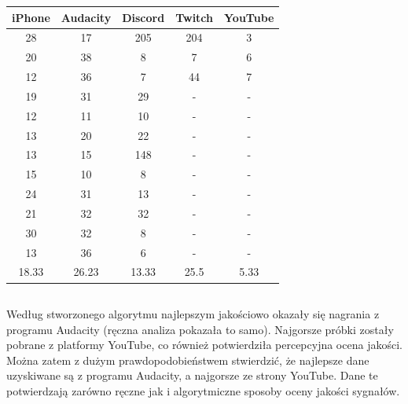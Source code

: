 \documentclass[a4paper,12pt]{extarticle}
\begin{document}
\begin{center}
    \begin{tabular}{||c c c c c||} 
     \hline
     iPhone & Audacity & Discord & Twitch & YouTube \\ [0.5ex] 
     \hline
     28 & 17 & 205 & 204 & 3\\ 
     \hline
     20 & 38 & 8 & 7 & 6\\
     \hline
     12 & 36 & 7 & 44 & 7\\
     \hline
     19 & 31 & 29 & - & -\\
     \hline
     12 & 11 & 10 & - & -\\
     \hline
     13 & 20 & 22 & - & -\\
     \hline
     13 & 15 & 148 & - & -\\
     \hline
     15 & 10 & 8 & - & -\\
     \hline
     24 & 31 & 13 & - & -\\
     \hline
     21 & 32 & 32 & - & -\\
     \hline
     30 & 32 & 8 & - & -\\
     \hline
     13 & 36 & 6 & - & -\\
     \hline
     18.33 & 26.23 & 13.33 & 25.5 & 5.33\\ [1ex] 
     \hline
    \end{tabular}
\end{center}

\subsection*{}
Według stworzonego algorytmu najlepszym jakościowo okazały się nagrania z programu Audacity (ręczna analiza pokazała to samo). Najgorsze próbki zostały pobrane z platformy YouTube, co również potwierdziła percepcyjna ocena jakości. Można zatem z dużym prawdopodobieństwem stwierdzić, że najlepsze dane uzyskiwane są z programu Audacity, a najgorsze ze strony YouTube. Dane te potwierdzają zarówno ręczne jak i algorytmiczne sposoby oceny jakości sygnałów.

\newpage

\printbibliography[title=Bibliografia]
\end{document}
